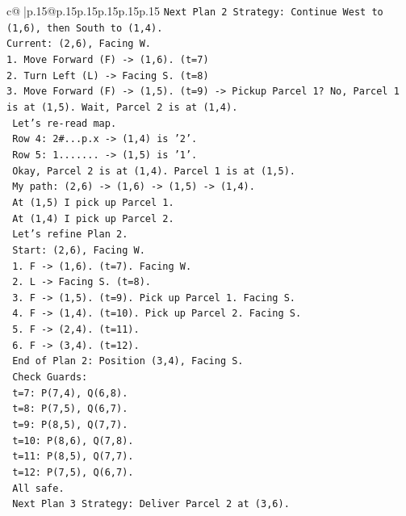 \documentclass{article}
\begin{document}
{\begin{supertabular}{c@{$\;$}|p{.15\linewidth}@{}p{.15\linewidth}p{.15\linewidth}p{.15\linewidth}p{.15\linewidth}p{.15\linewidth}}
{{{\texttt{Next Plan 2 Strategy: Continue West to (1,6), then South to (1,4).} \\
\texttt{Current: (2,6), Facing W.} \\
\texttt{1. Move Forward (F) {-}> (1,6). (t=7)} \\
\texttt{2. Turn Left (L) {-}> Facing S. (t=8)} \\
\texttt{3. Move Forward (F) {-}> (1,5). (t=9) {-}> Pickup Parcel 1? No, Parcel 1 is at (1,5). Wait, Parcel 2 is at (1,4).} \\
\texttt{   Let's re{-}read map.} \\
\texttt{   Row 4: 2\#...p.x {-}> (1,4) is '2'.} \\
\texttt{   Row 5: 1....... {-}> (1,5) is '1'.} \\
\texttt{   Okay, Parcel 2 is at (1,4). Parcel 1 is at (1,5).} \\
\texttt{   My path: (2,6) {-}> (1,6) {-}> (1,5) {-}> (1,4).} \\
\texttt{   At (1,5) I pick up Parcel 1.} \\
\texttt{   At (1,4) I pick up Parcel 2.} \\
\texttt{   Let's refine Plan 2.} \\
\texttt{   Start: (2,6), Facing W.} \\
\texttt{   1. F {-}> (1,6). (t=7). Facing W.} \\
\texttt{   2. L {-}> Facing S. (t=8).} \\
\texttt{   3. F {-}> (1,5). (t=9). Pick up Parcel 1. Facing S.} \\
\texttt{   4. F {-}> (1,4). (t=10). Pick up Parcel 2. Facing S.} \\
\texttt{   5. F {-}> (2,4). (t=11).} \\
\texttt{   6. F {-}> (3,4). (t=12).} \\
\texttt{   End of Plan 2: Position (3,4), Facing S.} \\
\texttt{   Check Guards:} \\
\texttt{   t=7: P(7,4), Q(6,8).} \\
\texttt{   t=8: P(7,5), Q(6,7).} \\
\texttt{   t=9: P(8,5), Q(7,7).} \\
\texttt{   t=10: P(8,6), Q(7,8).} \\
\texttt{   t=11: P(8,5), Q(7,7).} \\
\texttt{   t=12: P(7,5), Q(6,7).} \\
\texttt{   All safe.} \\
\texttt{   Next Plan 3 Strategy: Deliver Parcel 2 at (3,6).} \\
}}}
\end{supertabular}}
\end{document}
